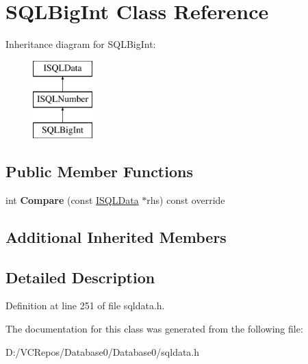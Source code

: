 \hypertarget{class_s_q_l_big_int}{}\section{S\+Q\+L\+Big\+Int Class Reference}
\label{class_s_q_l_big_int}
Inheritance diagram for S\+Q\+L\+Big\+Int\+:\begin{figure}[H]
\begin{center}
\leavevmode
\includegraphics[height=3.000000cm]{class_s_q_l_big_int}
\end{center}
\end{figure}
\subsection*{Public Member Functions}
\begin{DoxyCompactItemize}
\item 
\mbox{\label{class_s_q_l_big_int_a5be619b3fae18039e478191dbcd635a9}} 
int {\bfseries Compare} (const \mbox{\hyperlink{class_i_s_q_l_data}{I\+S\+Q\+L\+Data}} $\ast$rhs) const override
\end{DoxyCompactItemize}
\subsection*{Additional Inherited Members}


\subsection{Detailed Description}


Definition at line 251 of file sqldata.\+h.



The documentation for this class was generated from the following file\+:\begin{DoxyCompactItemize}
\item 
D\+:/\+V\+C\+Repos/\+Database0/\+Database0/sqldata.\+h\end{DoxyCompactItemize}
